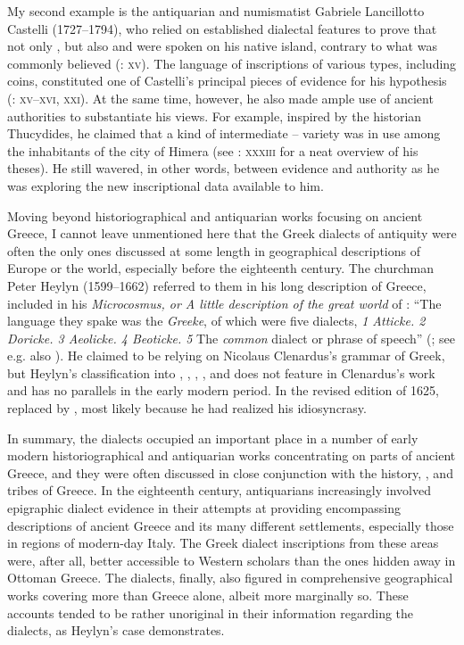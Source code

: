 My second example is the  antiquarian and numismatist Gabriele Lancillotto Castelli (1727–1794), who relied on established dialectal features to prove that not only , but also  and  were spoken on his native island, contrary to what was commonly believed (\citeyear{Castelli1769}: \textsc{xv}). The language of inscriptions of various types, including coins, constituted one of Castelli’s principal pieces of evidence for his hypothesis (\citealt{Castelli1769}: \textsc{xv–xvi,} \textsc{xxi}). At the same time, however, he also made ample use of ancient authorities to substantiate his views. For example, inspired by the historian Thucydides, he claimed that a kind of intermediate –  variety was in use among the inhabitants of the  city of Himera (see \citealt{Castelli1769}: \textsc{xxxiii} for a neat overview of his theses). He still wavered, in other words, between evidence and authority as he was exploring the new inscriptional data available to him.

Moving beyond historiographical and antiquarian works focusing on ancient Greece, I cannot leave unmentioned here that the Greek dialects of antiquity were often the only ones discussed at some length in geographical descriptions of Europe or the world, especially before the eighteenth century. The  churchman Peter Heylyn (1599–1662) referred to them in his long description of Greece, included in his \textit{Microcosmus, or A little description of the great world} of \citeyear{Heylyn1621}: “The language they spake was the \textit{Greeke}, of which were five dialects, \textit{1 Atticke. 2 Doricke. 3 Aeolicke. 4 Beoticke. 5} The \textit{common} dialect or phrase of speech” (\citealt[205]{Heylyn1621}; see e.g. also \citealt[15, 60, 63]{Speed1676}). He claimed to be relying on Nicolaus Clenardus’s grammar of Greek, but Heylyn’s classification into , , , , and  does not feature in Clenardus’s work and has no parallels in the early modern period. In the revised edition of 1625, \citet[375]{Heylyn1625} replaced  by , most likely because he had realized his idiosyncrasy.

In summary, the dialects occupied an important place in a number of early modern historiographical and antiquarian works concentrating on parts of ancient Greece, and they were often discussed in close conjunction with the history, , and tribes of Greece. In the eighteenth century, antiquarians increasingly involved epigraphic dialect evidence in their attempts at providing encompassing descriptions of ancient Greece and its many different settlements, especially those in regions of modern-day Italy. The Greek dialect inscriptions from these areas were, after all, better accessible to Western scholars than the ones hidden away in Ottoman Greece. The dialects, finally, also figured in comprehensive geographical works covering more than Greece alone, albeit more marginally so. These accounts tended to be rather unoriginal in their information regarding the dialects, as Heylyn’s case demonstrates.


